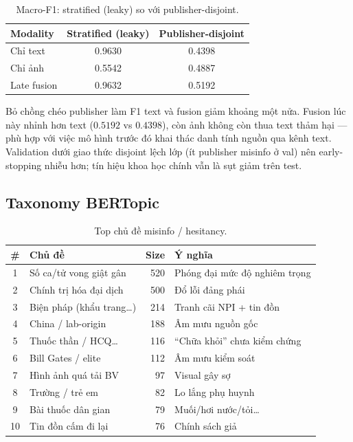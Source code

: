 \documentclass[12pt, a4paper]{report}
\begin{document}
\begin{table}[htbp]
\centering
\caption{Macro-F1: stratified (leaky) so với publisher-disjoint.}
\label{tab:ablation-compare}
\begin{tabular}{lcc}
\hline
Modality & Stratified (leaky) & Publisher-disjoint \\
\hline
Chỉ text & 0.9630 & 0.4398 \\
Chỉ ảnh & 0.5542 & 0.4887 \\
Late fusion & 0.9632 & 0.5192 \\
\hline
\end{tabular}
\end{table}

Bỏ chồng chéo publisher làm F1 text và fusion giảm khoảng một nửa.
Fusion lúc này nhỉnh hơn text ($0.5192$ vs $0.4398$), còn ảnh không còn thua text thảm hại --- phù hợp với việc mô hình trước đó khai thác danh tính nguồn qua kênh text.
Validation dưới giao thức disjoint lệch lớp (ít publisher misinfo ở val) nên early-stopping nhiễu hơn; tín hiệu khoa học chính vẫn là sụt giảm trên test.

\subsection{Taxonomy BERTopic}

\begin{table}[htbp]
\centering
\caption{Top chủ đề misinfo / hesitancy.}
\label{tab:taxonomy}
\small
\begin{tabular}{clrp{4.8cm}}
\hline
\# & Chủ đề & Size & Ý nghĩa \\
\hline
1 & Số ca/tử vong giật gân & 520 & Phóng đại mức độ nghiêm trọng \\
2 & Chính trị hóa đại dịch & 500 & Đổ lỗi đảng phái \\
3 & Biện pháp (khẩu trang\ldots) & 214 & Tranh cãi NPI + tin đồn \\
4 & China / lab-origin & 188 & Âm mưu nguồn gốc \\
5 & Thuốc thần / HCQ\ldots & 116 & ``Chữa khỏi'' chưa kiểm chứng \\
6 & Bill Gates / elite & 112 & Âm mưu kiểm soát \\
7 & Hình ảnh quá tải BV & 97 & Visual gây sợ \\
8 & Trường / trẻ em & 82 & Lo lắng phụ huynh \\
9 & Bài thuốc dân gian & 79 & Muối/hơi nước/tỏi\ldots \\
10 & Tin đồn cấm đi lại & 76 & Chính sách giả \\
\hline
\end{tabular}
\end{table}
\end{document}
